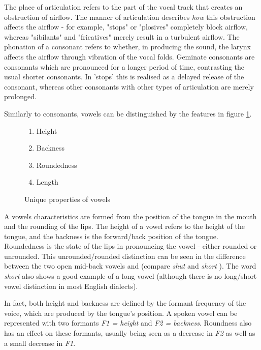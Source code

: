 \documentclass{report}
\begin{document}
	The place of articulation refers to the part of the vocal track that creates an obstruction of airflow. The manner of articulation describes \textit{how} this obstruction affects the airflow - for example, "stops" or "plosives" completely block airflow, whereas "sibilants" and "fricatives" merely result in a turbulent airflow. The phonation of a consonant refers to whether, in producing the sound, the larynx affects the airflow through vibration of the vocal folds. Geminate consonants are consonants which are pronounced for a longer period of time, contrasting the usual shorter consonants. In 'stops' this is realised as a delayed release of the consonant, whereas other consonants with other types of articulation are merely prolonged.
	
	Similarly to consonants, vowels can be distinguished by the features in figure \ref{properties of vowels}.
	
	\begin{figure}[h]
		\caption{Unique properties of vowels}
		\label{properties of vowels}
		\begin{tcolorbox}
			\begin{enumerate}
				\item Height
				\item Backness
				\item Roundedness
				\item Length
			\end{enumerate}
		\end{tcolorbox}
	\end{figure}

	A vowels characteristics are formed from the position of the tongue in the mouth and the rounding of the lips. The height of a vowel refers to the height of the tongue, and the backness is the forward/back position of the tongue. Roundedness is the state of the lips in pronouncing the vowel - either rounded or unrounded. This unrounded/rounded distinction can be seen in the difference between the two open mid-back vowels  and  (compare \textit{shut}  and \textit{short} ). The word \textit{short}  also shows a good example of a long vowel (although there is no long/short vowel distinction in most English dialects).
	
	In fact, both height and backness are defined by the formant frequency of the voice, which are produced by the tongue's position. A spoken vowel can be represented with two formants \textit{F1 = height} and \textit{F2 = backness}. Roundness also has an effect on these formants, usually being seen as a decrease in \textit{F2} as well as a small decrease in \textit{F1}.
	
\end{document}
